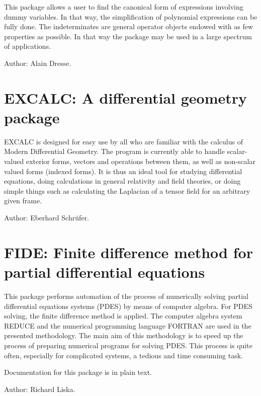 This package allows a user to find the canonical form of expressions
involving dummy variables. In that way, the simplification of
polynomial expressions can be fully done. The indeterminates are general
operator objects endowed with as few properties as possible. In that way
the package may be used in a large spectrum of applications.

Author: Alain Dresse.



\newpage

\section{EXCALC: A differential geometry package} 

EXCALC is designed for easy use by all who are familiar with the calculus
of Modern Differential Geometry. The program is currently able to handle
scalar-valued exterior forms, vectors and operations between them, as well
as non-scalar valued forms (indexed forms). It is thus an ideal tool for
studying differential equations, doing calculations in general relativity
and field theories, or doing simple things such as calculating the
Laplacian of a tensor field for an arbitrary given frame.

Author: Eberhard Schr\"ufer.



\newpage

\section{FIDE: Finite difference method for partial differential equations}

This package performs  automation of  the process of numerically
solving  partial  differential  equations  systems  (PDES)  by  means of
computer algebra.  For PDES solving, the finite difference method is applied.
The  computer  algebra  system  REDUCE  and  the  numerical  programming
language FORTRAN  are used in the presented methodology. The main aim of
this methodology is to speed up the process of preparing numerical
programs for  solving PDES.  This process is quite often, especially for
complicated systems, a tedious and time consuming task.

Documentation for this package is in plain text.

Author: Richard Liska.



